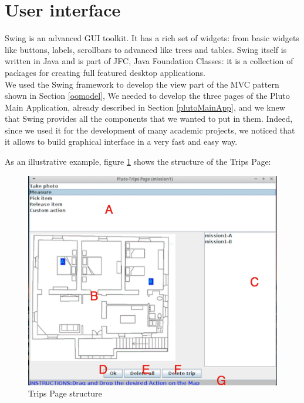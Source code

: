 \section{User interface}\label{interface}

Swing is an advanced GUI toolkit. It has a rich set of widgets:
from basic widgets like buttons, labels, scrollbars to advanced like trees and tables. 
Swing itself is written in Java and is part of JFC, Java Foundation Classes: it is a collection of packages for creating full featured desktop applications.
\\

We used the Swing framework to develop the view part of the MVC pattern shown in Section \ref{oomodel},
We needed to develop the three pages of the Pluto Main Application, already described in Section \ref{plutoMainApp}, and we knew that Swing provides all the components that we wanted to put in them.
Indeed, since we used it for the development of many academic projects, we noticed that it allows to build graphical interface in a very fast and easy way.

As an illustrative example, figure \ref{fig:tripsPageStructure} shows the structure of the Trips Page:

 \begin{figure}[h!]
 \includegraphics[width=\linewidth]
 {pictures/tripsPageStructure.png}
 \caption{Trips Page structure}
 \label{fig:tripsPageStructure}
 \end{figure}


